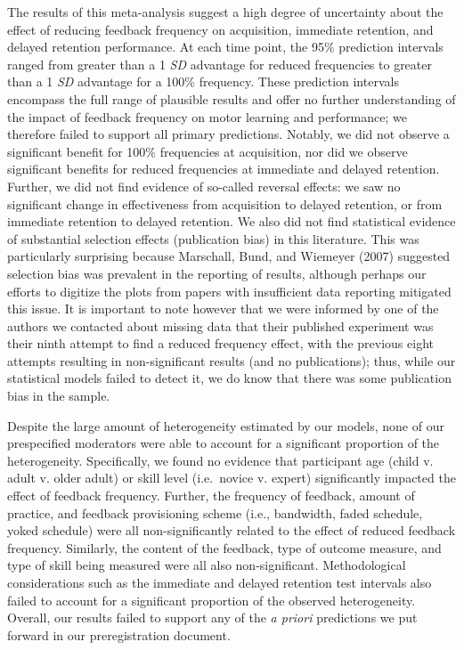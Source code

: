 \documentclass[
  english,
  man, donotrepeattitle,mask,floatsintext]{apa7}
\begin{document}
The results of this meta-analysis suggest a high degree of uncertainty about the effect of reducing feedback frequency on acquisition, immediate retention, and delayed retention performance. At each time point, the 95\% prediction intervals ranged from greater than a 1 \emph{SD} advantage for reduced frequencies to greater than a 1 \emph{SD} advantage for a 100\% frequency. These prediction intervals encompass the full range of plausible results and offer no further understanding of the impact of feedback frequency on motor learning and performance; we therefore failed to support all primary predictions. Notably, we did not observe a significant benefit for 100\% frequencies at acquisition, nor did we observe significant benefits for reduced frequencies at immediate and delayed retention. Further, we did not find evidence of so-called reversal effects: we saw no significant change in effectiveness from acquisition to delayed retention, or from immediate retention to delayed retention. We also did not find statistical evidence of substantial selection effects (publication bias) in this literature. This was particularly surprising because Marschall, Bund, and Wiemeyer (2007) suggested selection bias was prevalent in the reporting of results, although perhaps our efforts to digitize the plots from papers with insufficient data reporting mitigated this issue. It is important to note however that we were informed by one of the authors we contacted about missing data that their published experiment was their ninth attempt to find a reduced frequency effect, with the previous eight attempts resulting in non-significant results (and no publications); thus, while our statistical models failed to detect it, we do know that there was some publication bias in the sample.

Despite the large amount of heterogeneity estimated by our models, none of our prespecified moderators were able to account for a significant proportion of the heterogeneity. Specifically, we found no evidence that participant age (child v. adult v. older adult) or skill level (i.e.~novice v. expert) significantly impacted the effect of feedback frequency. Further, the frequency of feedback, amount of practice, and feedback provisioning scheme (i.e., bandwidth, faded schedule, yoked schedule) were all non-significantly related to the effect of reduced feedback frequency. Similarly, the content of the feedback, type of outcome measure, and type of skill being measured were all also non-significant. Methodological considerations such as the immediate and delayed retention test intervals also failed to account for a significant proportion of the observed heterogeneity. Overall, our results failed to support any of the \emph{a priori} predictions we put forward in our preregistration document.
\end{document}
